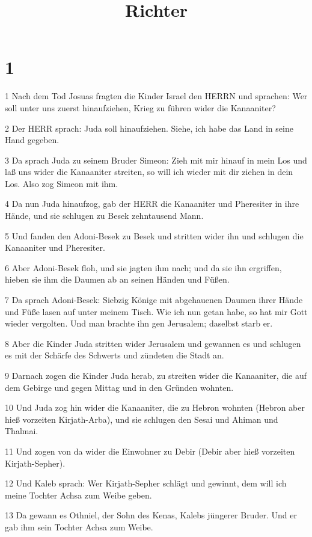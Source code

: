 

\title{Richter}


\chapter{1}

\par 1 Nach dem Tod Josuas fragten die Kinder Israel den HERRN und sprachen: Wer soll unter uns zuerst hinaufziehen, Krieg zu führen wider die Kanaaniter?
\par 2 Der HERR sprach: Juda soll hinaufziehen. Siehe, ich habe das Land in seine Hand gegeben.
\par 3 Da sprach Juda zu seinem Bruder Simeon: Zieh mit mir hinauf in mein Los und laß uns wider die Kanaaniter streiten, so will ich wieder mit dir ziehen in dein Los. Also zog Simeon mit ihm.
\par 4 Da nun Juda hinaufzog, gab der HERR die Kanaaniter und Pheresiter in ihre Hände, und sie schlugen zu Besek zehntausend Mann.
\par 5 Und fanden den Adoni-Besek zu Besek und stritten wider ihn und schlugen die Kanaaniter und Pheresiter.
\par 6 Aber Adoni-Besek floh, und sie jagten ihm nach; und da sie ihn ergriffen, hieben sie ihm die Daumen ab an seinen Händen und Füßen.
\par 7 Da sprach Adoni-Besek: Siebzig Könige mit abgehauenen Daumen ihrer Hände und Füße lasen auf unter meinem Tisch. Wie ich nun getan habe, so hat mir Gott wieder vergolten. Und man brachte ihn gen Jerusalem; daselbst starb er.
\par 8 Aber die Kinder Juda stritten wider Jerusalem und gewannen es und schlugen es mit der Schärfe des Schwerts und zündeten die Stadt an.
\par 9 Darnach zogen die Kinder Juda herab, zu streiten wider die Kanaaniter, die auf dem Gebirge und gegen Mittag und in den Gründen wohnten.
\par 10 Und Juda zog hin wider die Kanaaniter, die zu Hebron wohnten (Hebron aber hieß vorzeiten Kirjath-Arba), und sie schlugen den Sesai und Ahiman und Thalmai.
\par 11 Und zogen von da wider die Einwohner zu Debir (Debir aber hieß vorzeiten Kirjath-Sepher).
\par 12 Und Kaleb sprach: Wer Kirjath-Sepher schlägt und gewinnt, dem will ich meine Tochter Achsa zum Weibe geben.
\par 13 Da gewann es Othniel, der Sohn des Kenas, Kalebs jüngerer Bruder. Und er gab ihm sein Tochter Achsa zum Weibe.
